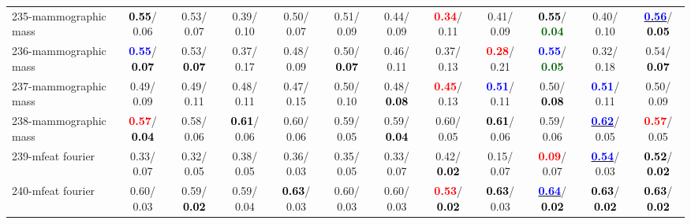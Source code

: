 \begin{table}[h]
\begin{center}
{\begin{tabular}{lc|c|c|c|c|c|c|c|c|c|c}
235-mammographic mass & \textcolor{black}{\textbf{  0.55}}/  0.06 &   0.53/  0.07 &   0.39/  0.10 &   0.50/  0.07 &   0.51/  0.09 &   0.44/  0.09 & \textcolor{red}{\textbf{  0.34}}/  0.11 &   0.41/  0.09 & \textcolor{black}{\textbf{  0.55}}/\textcolor{darkgreen}{\textbf{  0.04}} &   0.40/  0.10 & \underline{\textcolor{blue}{\textbf{  0.56}}}/\textcolor{black}{\textbf{  0.05}} \\
236-mammographic mass & \textcolor{blue}{\textbf{  0.55}}/\textcolor{black}{\textbf{  0.07}} &   0.53/\textcolor{black}{\textbf{  0.07}} &   0.37/  0.17 &   0.48/  0.09 &   0.50/\textcolor{black}{\textbf{  0.07}} &   0.46/  0.11 &   0.37/  0.13 & \textcolor{red}{\textbf{  0.28}}/  0.21 & \textcolor{blue}{\textbf{  0.55}}/\textcolor{darkgreen}{\textbf{  0.05}} &   0.32/  0.18 &   0.54/\textcolor{black}{\textbf{  0.07}} \\
237-mammographic mass &   0.49/  0.09 &   0.49/  0.11 &   0.48/  0.11 &   0.47/  0.15 &   0.50/  0.10 &   0.48/\textcolor{black}{\textbf{  0.08}} & \textcolor{red}{\textbf{  0.45}}/  0.13 & \textcolor{blue}{\textbf{  0.51}}/  0.11 &   0.50/\textcolor{black}{\textbf{  0.08}} & \textcolor{blue}{\textbf{  0.51}}/  0.11 &   0.50/  0.09 \\
238-mammographic mass & \textcolor{red}{\textbf{  0.57}}/\textcolor{black}{\textbf{  0.04}} &   0.58/  0.06 & \textcolor{black}{\textbf{  0.61}}/  0.06 &   0.60/  0.06 &   0.59/  0.05 &   0.59/\textcolor{black}{\textbf{  0.04}} &   0.60/  0.05 & \textcolor{black}{\textbf{  0.61}}/  0.06 &   0.59/  0.06 & \underline{\textcolor{blue}{\textbf{  0.62}}}/  0.05 & \textcolor{red}{\textbf{  0.57}}/  0.05 \\ \hline
239-mfeat fourier &   0.33/  0.07 &   0.32/  0.05 &   0.38/  0.05 &   0.36/  0.03 &   0.35/  0.05 &   0.33/  0.07 &   0.42/\textcolor{black}{\textbf{  0.02}} &   0.15/  0.07 & \textcolor{red}{\textbf{  0.09}}/  0.07 & \underline{\textcolor{blue}{\textbf{  0.54}}}/  0.03 & \textcolor{black}{\textbf{  0.52}}/\textcolor{black}{\textbf{  0.02}} \\
240-mfeat fourier &   0.60/  0.03 &   0.59/\textcolor{black}{\textbf{  0.02}} &   0.59/  0.04 & \textcolor{black}{\textbf{  0.63}}/  0.03 &   0.60/  0.03 &   0.60/  0.03 & \textcolor{red}{\textbf{  0.53}}/\textcolor{black}{\textbf{  0.02}} & \textcolor{black}{\textbf{  0.63}}/  0.03 & \underline{\textcolor{blue}{\textbf{  0.64}}}/\textcolor{black}{\textbf{  0.02}} & \textcolor{black}{\textbf{  0.63}}/\textcolor{black}{\textbf{  0.02}} & \textcolor{black}{\textbf{  0.63}}/\textcolor{black}{\textbf{  0.02}} \\

\end{tabular}}
\end{center}
\end{table}
